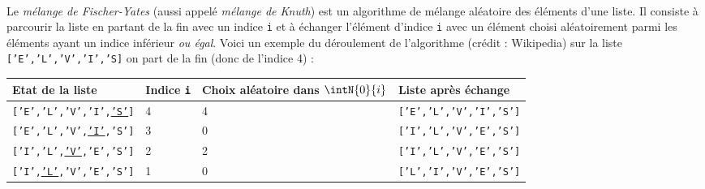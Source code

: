 \documentclass[11pt,a4paper]{article}
\begin{document}
\begin{Exercise}[title = {Permutation des éléments d'une liste}]
	\\
	Le \textit{mélange de Fischer-Yates} (aussi appelé \textit{mélange de Knuth}) est un algorithme de mélange aléatoire des éléments d'une liste. Il consiste à parcourir la liste en partant de la fin avec un indice {\tt i} et à échanger l'élément d'indice {\tt i} avec un élément choisi aléatoirement parmi les éléments ayant un indice inférieur \textit{ou égal}.
	Voici un exemple du déroulement de l'algorithme (crédit : Wikipedia) sur la liste {\tt ['E','L','V','I','S]} on part de la fin (donc de l'indice 4) : \\
	\begin{tabular}{|l|l|l|l|}
		\hline
		Etat de la liste                        & Indice {\tt i} & Choix aléatoire dans $\intN{0}{i}$ & Liste après échange         \\
		\hline
		{\tt ['E','L','V','I',\underline{'S'}]} & 4              & 4                                  & {\tt ['E','L','V','I','S']} \\
		{\tt ['E','L','V',\underline{'I'},'S']} & 3              & 0                                  & {\tt ['I','L','V','E','S']} \\
		{\tt ['I','L',\underline{'V'},'E','S']} & 2              & 2                                  & {\tt ['I','L','V','E','S']} \\
		{\tt ['I',\underline{'L'},'V','E','S']} & 1              & 0                                  & {\tt ['L','I','V','E','S']} \\
		\hline
	\end{tabular}
\end{Exercise}
\end{document}
